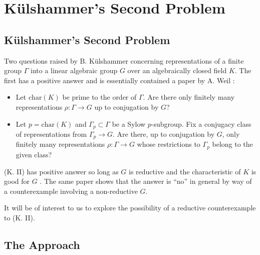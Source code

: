 
\chapter{K\"ulshammer's Second Problem}
\label{Chapter3}


\section{K\"ulshammer's Second Problem}

Two questions raised by B. K\"ulshammer concerning representations of a finite group $\Gamma$ into a linear algebraic group $G$ over an algebraically closed field $K$. The first has a positive answer  and is essentially contained a paper by A. Weil \cite{weil1964remarks}:
\begin{itemize}
	\item[(K. I)] Let $\mathrm{char}(K)$ be prime to the order of $\Gamma$. Are there only finitely many representations $\rho:\Gamma\rightarrow G$ up to conjugation by $G$?
	\item[(K. II)] Let $p = \mathrm{char}(K)$ and $\Gamma_p \subset  \Gamma$ be a Sylow $p$-subgroup. Fix a conjugacy class of representations from $\Gamma_p\rightarrow G$. Are there, up to conjugation by $G$, only finitely many representations $\rho:\Gamma\rightarrow G$ whose restrictions to $\Gamma_p$ belong to the given class?
\end{itemize}

(K. II) has positive answer so long as $G$ is reductive and the characteristic of $K$ is good for $G$ \cite{slodowy1997two}. The same paper shows that the answer is ``no'' in general by way of a counterexample involving a non-reductive $G$.

It will be of interest to us to explore the possibility of a reductive counterexample to (K. II).

\section{The Approach}

